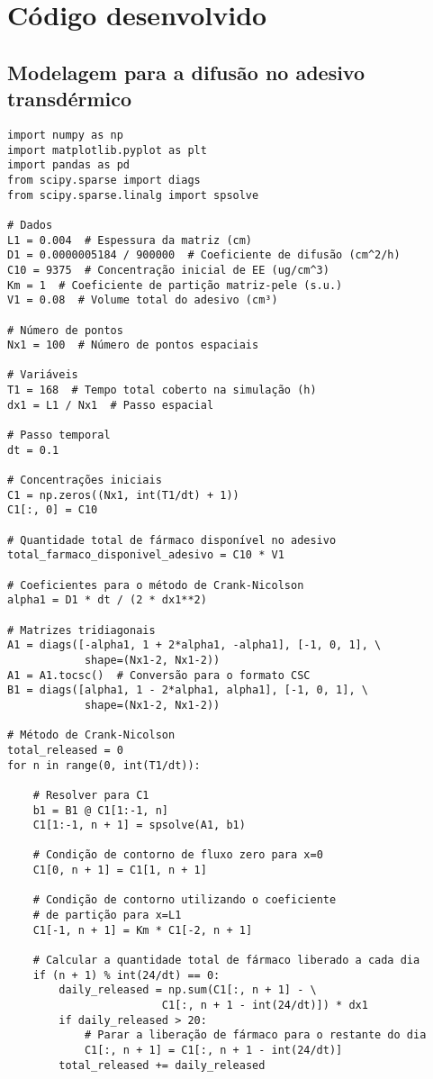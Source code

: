 \chapter{Código desenvolvido}

\section{Modelagem para a difusão no adesivo transdérmico}
\begin{verbatim}
import numpy as np
import matplotlib.pyplot as plt
import pandas as pd
from scipy.sparse import diags
from scipy.sparse.linalg import spsolve

# Dados
L1 = 0.004  # Espessura da matriz (cm)
D1 = 0.0000005184 / 900000  # Coeficiente de difusão (cm^2/h)
C10 = 9375  # Concentração inicial de EE (ug/cm^3)
Km = 1  # Coeficiente de partição matriz-pele (s.u.)
V1 = 0.08  # Volume total do adesivo (cm³)

# Número de pontos
Nx1 = 100  # Número de pontos espaciais

# Variáveis
T1 = 168  # Tempo total coberto na simulação (h)
dx1 = L1 / Nx1  # Passo espacial

# Passo temporal
dt = 0.1

# Concentrações iniciais
C1 = np.zeros((Nx1, int(T1/dt) + 1))
C1[:, 0] = C10

# Quantidade total de fármaco disponível no adesivo
total_farmaco_disponivel_adesivo = C10 * V1

# Coeficientes para o método de Crank-Nicolson
alpha1 = D1 * dt / (2 * dx1**2)

# Matrizes tridiagonais
A1 = diags([-alpha1, 1 + 2*alpha1, -alpha1], [-1, 0, 1], \
            shape=(Nx1-2, Nx1-2))
A1 = A1.tocsc()  # Conversão para o formato CSC
B1 = diags([alpha1, 1 - 2*alpha1, alpha1], [-1, 0, 1], \
            shape=(Nx1-2, Nx1-2))

# Método de Crank-Nicolson
total_released = 0
for n in range(0, int(T1/dt)):

    # Resolver para C1
    b1 = B1 @ C1[1:-1, n]
    C1[1:-1, n + 1] = spsolve(A1, b1)
    
    # Condição de contorno de fluxo zero para x=0
    C1[0, n + 1] = C1[1, n + 1]

    # Condição de contorno utilizando o coeficiente 
    # de partição para x=L1
    C1[-1, n + 1] = Km * C1[-2, n + 1]

    # Calcular a quantidade total de fármaco liberado a cada dia
    if (n + 1) % int(24/dt) == 0:
        daily_released = np.sum(C1[:, n + 1] - \
                        C1[:, n + 1 - int(24/dt)]) * dx1
        if daily_released > 20:
            # Parar a liberação de fármaco para o restante do dia
            C1[:, n + 1] = C1[:, n + 1 - int(24/dt)]
        total_released += daily_released


\end{verbatim}
